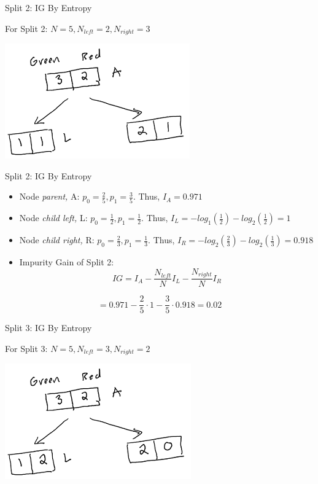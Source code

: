 \documentclass[
  ignorenonframetext,
]{beamer}
\begin{document}
\begin{frame}{Split 2: IG By Entropy}
\protect\hypertarget{split-2-ig-by-entropy}{}

For Split 2: \(N = 5, N_{left} =2, N_{right} = 3\)

\includegraphics{images2/im3.png}

\end{frame}

\begin{frame}{Split 2: IG By Entropy}
\protect\hypertarget{split-2-ig-by-entropy-1}{}

\begin{itemize}
\item
  Node \emph{parent,} A: \(p_0 = \frac{2}{5}, p_1 = \frac{3}{5}\). Thus,
  \(I_{A} = 0.971\)
\item
  Node \emph{child left,} L: \(p_0 = \frac{1}{2}, p_1 = \frac{1}{2}\).
  Thus, \(I_{L} = - log_1(\frac{1}{2})-log_2(\frac{1}{2})=1\)
\item
  Node \emph{child right,} R: \(p_0 = \frac{2}{3}, p_1 = \frac{1}{3}\).
  Thus, \(I_{R} = -log_2(\frac{2}{3}) -log_2(\frac{1}{3}) = 0.918\)
\item
  Impurity Gain of Split 2: \[
  IG = I_{A} - \frac{N_{left}}{N}I_{L}-\frac{N_{right}}{N}I_{R}
  \]
\end{itemize}

\[ = 0.971 - \frac{2}{5} \cdot 1-\frac{3}{5} \cdot 0.918 = 0.02\]

\end{frame}

\begin{frame}{Split 3: IG By Entropy}
\protect\hypertarget{split-3-ig-by-entropy}{}

For Split 3: \(N = 5, N_{left} =3, N_{right} = 2\)

\includegraphics{images2/im2.png}

\end{frame}
\end{document}
